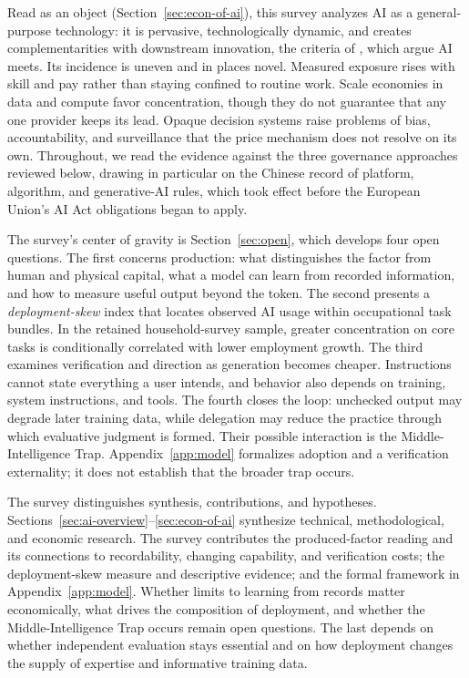 \documentclass[12pt]{article}
\theoremstyle{plain}
\theoremstyle{definition}
\theoremstyle{remark}
\begin{document}
Read as an object (Section~\ref{sec:econ-of-ai}), this survey analyzes AI
as a general-purpose technology: it is pervasive, technologically
dynamic, and creates complementarities with downstream innovation, the
criteria of \citet{BresnahanTrajtenberg1995}, which
\citet{BrynjolfssonRockSyverson2019} argue AI meets. Its incidence is uneven
and in places novel. Measured exposure rises with skill and pay rather than staying
confined to routine work. Scale economies in data and compute favor
concentration, though they do not guarantee that any one provider keeps
its lead. Opaque decision systems raise
problems of bias, accountability, and surveillance that the price
mechanism does not resolve on its own. Throughout, we read the evidence
against the three governance approaches reviewed below,
drawing in particular on the Chinese record of platform, algorithm, and
generative-AI rules, which took effect before the European Union's AI
Act obligations began to apply.

The survey's center of gravity is Section~\ref{sec:open}, which
develops four open questions. The first concerns production: what
distinguishes the factor from human and physical capital, what a model
can learn from recorded information, and how to measure useful output
beyond the token. The second presents a \emph{deployment-skew} index
that locates observed AI usage within occupational task bundles. In the
retained household-survey sample, greater concentration on core tasks
is conditionally correlated with lower employment growth. The third
examines verification and direction as generation becomes cheaper.
Instructions cannot state everything a user intends, and behavior also
depends on training, system instructions, and tools. The fourth closes
the loop: unchecked output may degrade later training data, while
delegation may reduce the practice through which evaluative judgment is
formed. Their possible interaction is the Middle-Intelligence Trap.
Appendix~\ref{app:model} formalizes adoption and a verification
externality; it does not establish that the broader trap occurs.

The survey distinguishes synthesis, contributions, and hypotheses.
Sections~\ref{sec:ai-overview}--\ref{sec:econ-of-ai} synthesize
technical, methodological, and economic research. The survey contributes
the produced-factor reading and its connections to recordability,
changing capability, and verification costs; the deployment-skew measure
and descriptive evidence; and the formal framework in
Appendix~\ref{app:model}. Whether limits to learning from records matter
economically, what drives the composition of deployment, and whether the
Middle-Intelligence Trap occurs remain open questions. The last depends on whether independent evaluation stays essential and on how deployment
changes the supply of expertise and informative training data.
\end{document}

